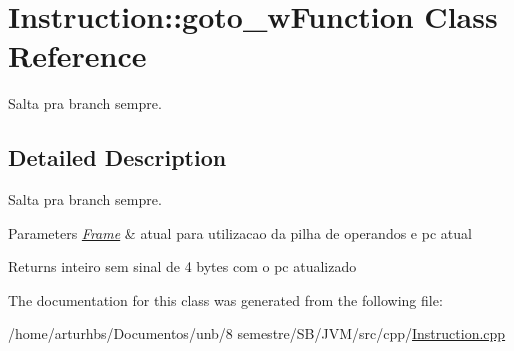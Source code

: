 \hypertarget{classInstruction_1_1goto__wFunction}{}\section{Instruction\+:\+:goto\+\_\+w\+Function Class Reference}
\label{classInstruction_1_1goto__wFunction}


Salta pra branch sempre.  




\subsection{Detailed Description}
Salta pra branch sempre. 


\begin{DoxyParams}{Parameters}
{\em \hyperlink{classFrame}{Frame}} & atual para utilizacao da pilha de operandos e pc atual \\
\hline
\end{DoxyParams}
\begin{DoxyReturn}{Returns}
inteiro sem sinal de 4 bytes com o pc atualizado 
\end{DoxyReturn}


The documentation for this class was generated from the following file\+:\begin{DoxyCompactItemize}
\item 
/home/arturhbs/\+Documentos/unb/8 semestre/\+S\+B/\+J\+V\+M/src/cpp/\hyperlink{Instruction_8cpp}{Instruction.\+cpp}\end{DoxyCompactItemize}

